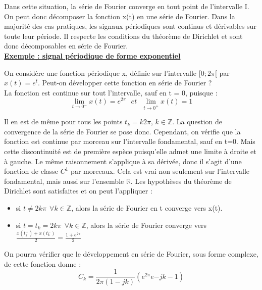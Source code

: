 	Dans cette situation, la série de Fourier converge en tout point de l'intervalle I. On peut donc décomposer la fonction x(t) en une série de Fourier. Dans la majorité des cas pratiques, les signaux périodiques sont continus et dérivables sur toute leur période. Il respecte les conditions du théorème de Dirichlet et sont donc décomposables en série de Fourier.	\\
	
	
	\underline{\textbf{Exemple : signal périodique de forme exponentiel}}
	
	On considère une fonction périodique x, définie sur l'intervalle $[0;2\pi[$ par $x(t)=e^{t}$. Peut-on développer cette fonction en série de Fourier ?\\
	
	La fonction est continue sur tout l'intervalle, sauf en t = 0, puisque :
	\begin{equation*}
	\lim_{t \to 0^{-}}x(t)=e^{2\pi}~~~et~~~\lim_{t \to 0^{+}}x(t)=1
	\end{equation*}
	
	Il en est de même pour tous les points $t_{k}=k2\pi$, $k \in \mathbb{Z}$. La question de convergence de la série de Fourier se pose donc. Cependant, on vérifie que la fonction est continue par morceau sur l'intervalle fondamental, sauf en t=0. Mais cette discontinuité est de première espèce puisqu'elle admet une limite à droite et à gauche. Le même raisonnement s'applique à sa dérivée, donc il s'agit d'une fonction de classe $C^{1}$ par morceaux. Cela est vrai non seulement sur l'intervalle fondamental, mais aussi sur l'ensemble $\mathbb{R}$. Les hypothèses du théorème de Dirichlet
	sont satisfaites et on peut l'appliquer :
	\begin{itemize}
		\item si $t \neq 2k\pi~~\forall k \in \mathbb{Z}$, alors la série de Fourier en t converge vers x(t).
		\item si $ t = t_{k}= 2k\pi~~\forall k \in \mathbb{Z}$, alors la série de Fourier converge vers $\frac{x(t_{k}^{+})+x(t_{k}^{-})}{2}=\frac{1+e^{2\pi}}{2}$
	\end{itemize}

	On pourra vérifier que le développement en série de Fourier, sous forme complexe, de cette fonction donne :
	\begin{equation*}
	C_{k}=\frac{1}{2\pi(1-jk)}(e^{2\pi}e{-jk}-1)
	\end{equation*}
	
	\vspace{1\baselineskip}

